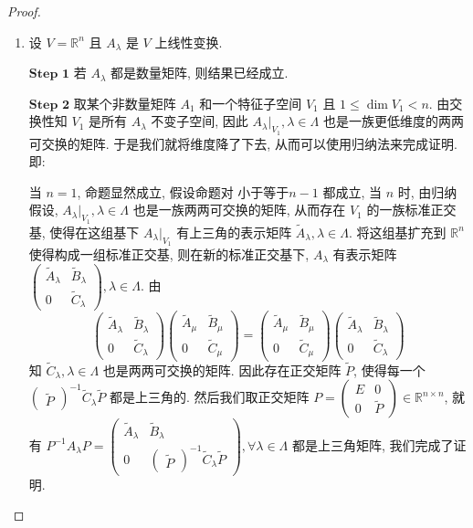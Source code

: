 \documentclass[../../main.tex]{subfiles}%
\begin{document}
\begin{proof}
\begin{enumerate}
\item 设 $V = \mathbb{R}^n$ 且 $A_{\lambda}$ 是 $V$ 上线性变换.

$\mathbf{Step}\,\,\mathbf{1}$ 若 $A_{\lambda}$ 都是数量矩阵, 则结果已经成立.

$\mathbf{Step}\,\,\mathbf{2}$  取某个非数量矩阵 $A_1$ 和一个特征子空间 $V_1$ 且 $1 \leqslant  \dim V_1 < n$. 由交换性知 $V_1$ 是所有 $A_{\lambda}$ 不变子空间, 因此 $A_{\lambda}|_{V_1}, \lambda \in \Lambda$ 也是一族更低维度的两两可交换的矩阵. 于是我们就将维度降了下去, 从而可以使用归纳法来完成证明. 即:

当 $n = 1$, 命题显然成立, 假设命题对 小于等于$n - 1$ 都成立, 当 $n$ 时, 由归纳假设, $A_{\lambda}|_{V_1}, \lambda \in \Lambda$ 也是一族两两可交换的矩阵, 从而存在 $V_1$ 的一族标准正交基, 使得在这组基下 $A_{\lambda}|_{V_1}$ 有上三角的表示矩阵 $\widetilde{A}_{\lambda}, \lambda \in \Lambda$. 将这组基扩充到 $\mathbb{R}^n$ 使得构成一组标准正交基, 则在新的标准正交基下, $A_{\lambda}$ 有表示矩阵 $\begin{pmatrix} \widetilde{A}_{\lambda} & \widetilde{B}_{\lambda} \\ 0 & \widetilde{C}_{\lambda} \end{pmatrix}, \lambda \in \Lambda$. 由
\[
\begin{pmatrix} \widetilde{A}_{\lambda} & \widetilde{B}_{\lambda} \\ 0 & \widetilde{C}_{\lambda} \end{pmatrix} \begin{pmatrix} \widetilde{A}_{\mu} & \widetilde{B}_{\mu} \\ 0 & \widetilde{C}_{\mu} \end{pmatrix} = \begin{pmatrix} \widetilde{A}_{\mu} & \widetilde{B}_{\mu} \\ 0 & \widetilde{C}_{\mu} \end{pmatrix} \begin{pmatrix} \widetilde{A}_{\lambda} & \widetilde{B}_{\lambda} \\ 0 & \widetilde{C}_{\lambda} \end{pmatrix}
\]
知 $\widetilde{C}_{\lambda}, \lambda \in \Lambda$ 也是两两可交换的矩阵. 因此存在正交矩阵 $\widetilde{P}$, 使得每一个 $\begin{pmatrix} \widetilde{P} \end{pmatrix}^{-1} \widetilde{C}_{\lambda} \widetilde{P}$ 都是上三角的. 然后我们取正交矩阵 $P = \begin{pmatrix} E & 0 \\ 0 & \widetilde{P} \end{pmatrix} \in \mathbb{R}^{n \times n}$, 就有 $P^{-1}A_{\lambda}P = \begin{pmatrix} \widetilde{A}_{\lambda} & \widetilde{B}_{\lambda} \\ 0 & \begin{pmatrix} \widetilde{P} \end{pmatrix}^{-1} \widetilde{C}_{\lambda} \widetilde{P} \end{pmatrix}, \forall \lambda \in \Lambda$ 都是上三角矩阵, 我们完成了证明.
\end{enumerate}
\end{proof}
\end{document}
